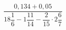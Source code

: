 \begin{ex}[type=calculate]
	\begin{condition}
		\( \dfrac{0,134+0,05}{18\dfrac{1}{6}-1\dfrac{11}{14}-\dfrac{2}{15}\cdot2\dfrac{6}{7}} \)
	\end{condition}
\end{ex}